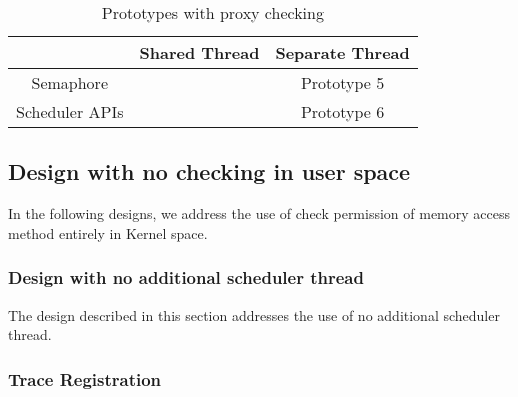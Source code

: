 \begin{table}[h]
\begin{center}
 \begin{tabular}{|c c c|} 
 \hline
 & Shared Thread & Separate Thread\\ %
 \hline
Semaphore &  & Prototype 5\\
Scheduler APIs &  & Prototype 6\\
\hline
\end{tabular}
\end{center}
\caption{Prototypes with proxy checking}
\label{protos_with_proxy}
\end{table}


\subsection{Design with no checking in user space}

In the following designs, we address the use of check permission of memory access method entirely in Kernel space.

\subsubsection{Design with no additional scheduler thread} \label{no_check_no_add}

The design described in this section addresses the use of no additional scheduler thread. 


\subsubsection*{Trace Registration}

